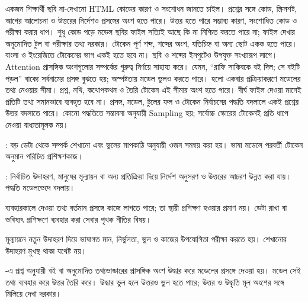 একজন শিক্ষার্থী ছবি না-দেখানো HTML কোডের কারণ ও সংশোধন জানতে চাইল। প্রশ্নের সঙ্গে কোড, স্ক্রিনশট, আগের আলোচনা ও উত্তরের নির্দেশও প্রসঙ্গের অংশ হতে পারে। উত্তর হতে পারে সম্ভাব্য কারণ, সংশোধিত কোড ও পরীক্ষা করার ধাপ। শুধু কোড পড়ে মডেল ছবির ফাইল সত্যিই আছে কি না নিশ্চিত করতে পারে না; ফাইল দেখার অনুমোদিত টুল বা পরীক্ষার তথ্য দরকার।
টোকেন পূর্ণ শব্দ, শব্দের অংশ, যতিচিহ্ন বা অন্য ছোট একক হতে পারে। বাংলা ও ইংরেজিতে টোকেনের ভাগ একই হতে হবে না। ছবি ও শব্দের ইনপুটেও উপযুক্ত সংখ্যারূপ লাগে। Attention প্রাসঙ্গিক অংশগুলোর সম্পর্কের গুরুত্ব নির্ণয়ে সাহায্য করে। যেমন, ``রাফি সাকিবকে বই দিল; সে বইটি পড়ল'' বাক্যে সর্বনামের প্রসঙ্গ বুঝতে হয়; অস্পষ্টতায় মডেল ভুলও করতে পারে।
 হলো একবার প্রক্রিয়াকরণে মডেলের তথ্য নেওয়ার সীমা। প্রশ্ন, নথি, কথোপকথন ও তৈরি টোকেন এই সীমার অংশ হতে পারে। দীর্ঘ ফাইল দেওয়া মানেই প্রতিটি তথ্য সমানভাবে ব্যবহৃত হবে না। প্রসঙ্গ, মডেল, টুলের ফল ও টোকেন নির্বাচনের পদ্ধতি বদলালে একই প্রশ্নের উত্তর বদলাতে পারে। কোনো পদ্ধতিতে সম্ভাবনা অনুযায়ী Sampling হয়; সর্বোচ্চ স্কোরের টোকেনই প্রতি ধাপে নেওয়া বাধ্যতামূলক নয়।
\begin{compactpoints}
\item {}: বড় ডেটা থেকে সম্পর্ক শেখানো এবং ভুলের মাপকাঠি অনুযায়ী ওজন সমন্বয় করা হয়। ভাষা মডেলে পরবর্তী টোকেন অনুমান পরিচিত প্রশিক্ষণকাজ।
\item {}: নির্বাচিত উদাহরণ, মানুষের মূল্যায়ন বা অন্য প্রতিক্রিয়া দিয়ে নির্দেশ অনুসরণ ও উত্তরের আচরণ উন্নত করা যায়। পদ্ধতি মডেলভেদে বদলায়।
\item ব্যবহারকালে দেওয়া তথ্য বর্তমান প্রসঙ্গে কাজে লাগতে পারে; তা স্থায়ী প্রশিক্ষণ হওয়ার প্রমাণ নয়। ডেটা রাখা বা ভবিষ্যৎ প্রশিক্ষণে ব্যবহার করা সেবার পৃথক নীতির বিষয়।
\item মূল্যায়নে নতুন উদাহরণ দিয়ে ভাষাগত মান, নির্ভুলতা, ভুল ও কাজের উপযোগিতা পরীক্ষা করতে হয়। শেখানোর উদাহরণ মুখস্থ থাকা যথেষ্ট নয়।
\end{compactpoints}
-এ প্রশ্ন অনুযায়ী বই বা অনুমোদিত তথ্যভান্ডারের প্রাসঙ্গিক অংশ উদ্ধার করে মডেলের প্রসঙ্গে দেওয়া হয়। মডেল সেই তথ্য ব্যবহার করে উত্তর তৈরি করে। উদ্ধার ভুল হলে উত্তরও ভুল হতে পারে; উত্তর ও উদ্ধৃতি মূল অংশের সঙ্গে মিলিয়ে দেখা দরকার।
